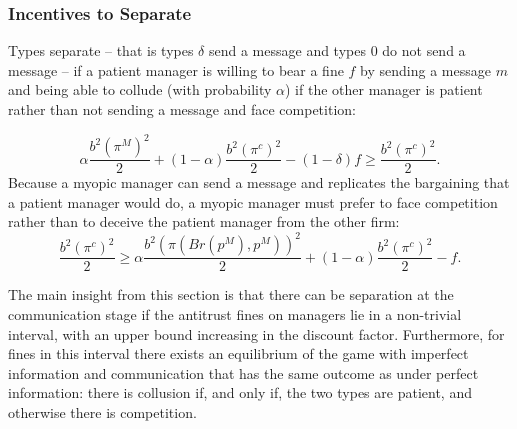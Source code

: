 \documentclass[]{article}
\begin{document}
\subsubsection*{Incentives to Separate}
Types separate -- that is types $\delta$ send a message and types $0$ do not send a message -- if a patient manager is willing to bear a fine $f$ by sending a message $m$ and being able to collude (with probability $\alpha$) if the other manager is patient rather than not sending a message and face competition:

\begin{equation}\tag{ICpatient}%
\alpha \frac{b^2 (\pi^M)^2}{2} + (1-\alpha)  \frac{b^2 (\pi^c)^2}{2} - (1-\delta)f \geq \frac{b^2 (\pi^c)^2}{2}.
\end{equation}
%
Because a myopic manager can send a message and replicates the bargaining that a patient manager would do, a myopic manager must prefer to face competition rather than to deceive the patient manager from the other firm:
%
\begin{equation}\tag{ICmyopic}%
\frac{b^2 (\pi^c)^2}{2}  \geq \alpha \frac{b^2 (\pi(Br(p^M),p^M))^2}{2} + (1-\alpha) \frac{b^2 (\pi^c)^2}{2} - f.
\end{equation}
%

The main insight from this section is that there can be separation at the communication stage if the antitrust fines on managers lie in a non-trivial interval, with an upper bound increasing in the discount factor. Furthermore, for fines in this interval there exists an equilibrium of the game with imperfect information and communication that has the same outcome as under perfect information: there is collusion if, and only if, the two types are patient, and otherwise there is competition.
\end{document}
